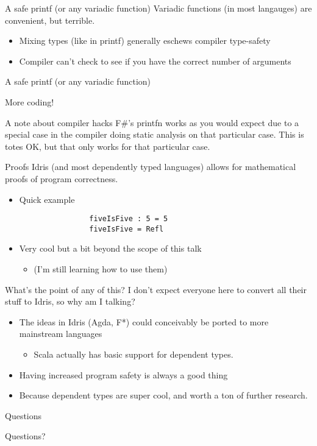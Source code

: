 \documentclass{beamer}
\begin{document}
\begin{frame}{A safe printf (or any variadic function)}
	\transdissolve
	Variadic functions (in most langauges) are convenient, but terrible.
	\begin{itemize}
	  \pause
          \item Mixing types (like in printf) generally eschews compiler type-safety
	  \pause
	  \item Compiler can't check to see if you have the correct number of arguments
	\end{itemize}
\end{frame}
\begin{frame}{A safe printf (or any variadic function)}
	\transdissolve[duration=0.3]
	\begin{center} 
	  More coding!
	\end{center}
\end{frame}
\begin{frame}{A note about compiler hacks}
 		\transdissolve
  F\#'s printfn works as you would expect due to a special case in the compiler doing static analysis on that particular case. 
  \linebreak
  \linebreak
  \pause
  This is totes OK, but that only works for that particular case.
\end{frame}
\begin{frame}[fragile]{Proofs}
	\transdissolve[duration=0.3]
	Idris (and most dependently typed languages) allows for mathematical proofs of program correctness. 
	\begin{itemize}
		\pause
		\item Quick example
			\begin{lstlisting}
				fiveIsFive : 5 = 5
				fiveIsFive = Refl
			\end{lstlisting}

		\pause
		\item Very cool but a bit beyond the scope of this talk \begin{itemize} 
				\pause
				\item (I'm still learning how to use them)
			\end{itemize}
	\end{itemize}
\end{frame}
\begin{frame}{What's the point of any of this? }
 	\transdissolve[duration=0.3]
	I don't expect everyone here to convert all their stuff to Idris, so why am I talking? 
	\begin{itemize}
		\pause
		\item The ideas in Idris (Agda, F*) could conceivably be ported to more mainstream languages \begin{itemize} 
				\pause
				\item Scala actually has basic support for dependent types.
			\end{itemize}	
		\pause
		\item Having increased program safety is always a good thing
		\pause
		\item Because dependent types are super cool, and worth a ton of further research. 
	\end{itemize}
\end{frame}
\begin{frame}{Questions }
	\transdissolve[duration=0.3]
	\begin{center}
		Questions? 
	\end{center}
\end{frame}
\end{document}
